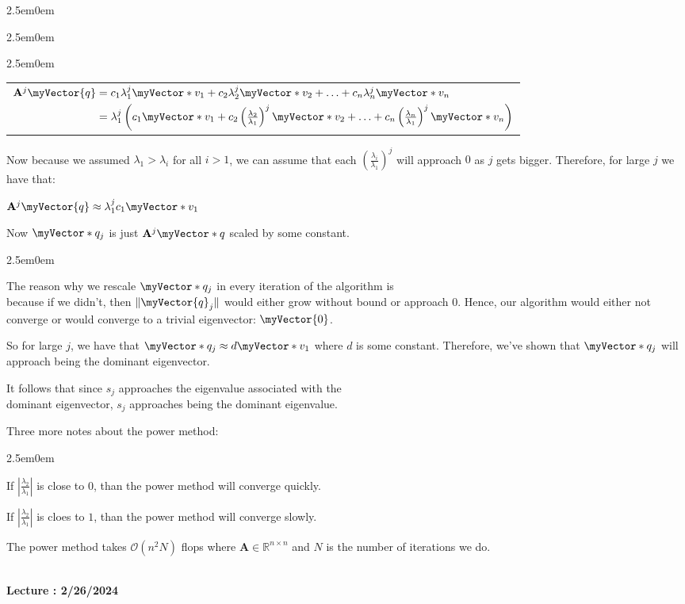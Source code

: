\documentclass{book}
\newcommand{\teachComment}{
   \color{Orange}%
   \fontsize{12}{14}\selectfont%
}
\newenvironment{myIndent}{%
   \begin{adjustwidth}{2.5em}{0em}%
}{%
   \end{adjustwidth}%
}
\newcounter{LectureNumber}
\newcommand*{\markLecture}[1]{%
   \stepcounter{LectureNumber}%
   {\huge \color{Black} \textbf{Lecture \theLectureNumber: #1} \newline}%
}
\newcommand{\mySepTwo}[1][.]{%
   {\noindent\color{#1}{\rule{6.5in}{0.5mm}}}\\%
}
\newcommand{\retTwo}{\hfill\bigbreak}
\newcommand{\mVec}[1]{\myVector{#1}}
\newcommand{\mVecAst}[1]{\myVector*{#1}}
\newcommand{\mMat}[1]{\mathbf{#1}}
\begin{document}
{\begin{myIndent}
{\begin{myIndent}
\begin{myIndent}
            \begin{center}
               \begin{tabular}{l}
                  $ \mMat{A}^j\mVec{q} = c_1\lambda_1^j\mVecAst{v}_1 + c_2\lambda_2^j\mVecAst{v}_2 + \ldots + c_n\lambda_n^j\mVecAst{v}_n$ \\
                  $\phantom{\mMat{A}^j\mVec{q}} = \lambda_1^j\left( c_1\mVecAst{v}_1 + c_2\left(\frac{\lambda_2}{\lambda_1}\right)^j\mVecAst{v}_2 + \ldots + c_n\left(\frac{\lambda_n}{\lambda_1}\right)^j\mVecAst{v}_n \right)$
               \end{tabular}
            \end{center}
            \retTwo
   
            Now because we assumed $\lambda_1 > \lambda_i$ for all $i > 1$, we can assume that each $\left(\frac{\lambda_i}{\lambda_1}\right)^j$ will approach $0$ as $j$ gets bigger. Therefore, for large $j$ we have that:
            
            {\center $\mMat{A}^j\mVec{q} \approx \lambda_1^{\vphantom{|}j}c_1\mVecAst{v}_1$ \retTwo\par}
            
            Now $\mVecAst{q}_j$ is just $\mMat{A}^j\mVecAst{q}$ scaled by some constant. 
            \begin{myIndent}
               The reason why we rescale $\mVecAst{q}_j$ in every iteration of the algorithm is\\ because if we didn't, then $\|\mVec{q}_j\|$ would either grow without bound or approach $0$. Hence, our algorithm would either not converge or would converge to a trivial eigenvector: $\mVec{0}$.
            \end{myIndent}

            \newpage

            So for large $j$, we have that $\mVecAst{q}_j \approx d\mVecAst{v}_1$ where $d$ is some constant. Therefore, we've shown that $\mVecAst{q}_j$ will approach being the dominant eigenvector. \retTwo

            It follows that since $s_j$ approaches the eigenvalue associated with the\\ dominant eigenvector, $s_j$ approaches being the dominant eigenvalue. \retTwo
         \end{myIndent}
      \end{myIndent}}

      \teachComment
      Three more notes about the power method:
      \begin{myIndent}
         If $\left|\frac{\lambda_2}{\lambda_1}\right|$ is close to $0$, than the power method will converge quickly.\retTwo
   
         If $\left|\frac{\lambda_2}{\lambda_1}\right|$ is cloes to $1$, than the power method will converge slowly.\retTwo
   
         The power method takes $\mathcal{O}(n^2N)$ flops where $\mMat{A} \in \mathbb{R}^{n\times n}$ and $N$ is the number of iterations we do. \retTwo
      \end{myIndent}
   \end{myIndent}}

   \mySepTwo

   \markLecture{2/26/2024}
\end{document}
